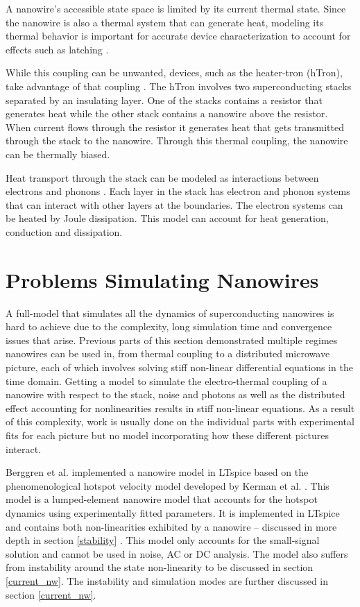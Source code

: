 A nanowire's accessible state space is limited by its current thermal state.
Since the nanowire is also a thermal system that can generate heat,
modeling its thermal behavior is important for
accurate device characterization to account for effects such as latching 
\cite{electro_thermal_modelling}.

While this coupling can be unwanted, devices, such as the heater-tron (hTron), 
take advantage of that coupling \cite{htron_paper}. 
The hTron involves two superconducting stacks separated
by an insulating layer. One of the stacks contains a resistor that generates heat while the
other stack contains a nanowire above the resistor. When current flows through the resistor
it generates heat that gets transmitted through the stack to the nanowire. Through this thermal
coupling, the nanowire can be thermally biased.

Heat transport through the stack can be modeled as interactions between electrons 
and phonons \cite{htron_paper}. Each layer in the stack has
electron and phonon systems that can interact with other
layers at the boundaries.
The electron systems can be heated by Joule dissipation.
This model can account for heat generation, conduction
and dissipation.


\section{Problems Simulating Nanowires}

A full-model that simulates all the dynamics of superconducting nanowires is hard to achieve
due to the complexity, long simulation time and convergence issues
that arise.
Previous parts of this section demonstrated multiple regimes nanowires can be used in,
from thermal coupling to a distributed microwave picture, each of which involves solving
stiff non-linear differential equations in the time domain. Getting a model to simulate
the electro-thermal coupling of a nanowire with respect to the stack, noise and photons
as well as the distributed effect accounting for nonlinearities results in stiff non-linear
equations. 
As a result of this complexity, work is usually done on the individual parts
with experimental fits for each picture but no model incorporating how these
different pictures interact. 

Berggren et al. implemented a nanowire model in LTspice based on the phenomenological hotspot 
velocity model developed by Kerman et al. \cite{karl_spice, phen_model}. 
This model is a lumped-element nanowire model that accounts 
for the hotspot dynamics using experimentally fitted parameters. It is implemented in LTspice
and contains both non-linearities exhibited by a nanowire -- discussed in more depth 
in section \ref{stability} \cite{karl_spice}. This model only 
accounts for the small-signal solution and cannot be used in noise, AC or DC analysis.
The model also suffers from instability around the state non-linearity to be discussed in section \ref{current_nw}. The instability and 
simulation modes are further discussed in section \ref{current_nw}.

